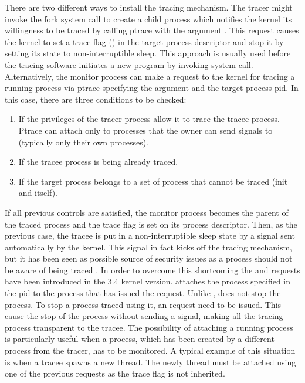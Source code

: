 There are two different ways to install the tracing mechanism. The tracer might invoke the fork system call to create a child process which notifies the kernel its willingness to be traced by calling ptrace with the argument . This request causes the kernel to set a trace flag () in the target process descriptor and stop it by setting its state to non-interruptible sleep. This approach is usually used before the tracing software initiates a new program by invoking  system call. Alternatively, the monitor process can make a request to the kernel for tracing a running process via ptrace specifying the argument  and the target process pid. In this case, there are three conditions to be checked:
\begin{enumerate}
\item If the privileges of the tracer process allow it to trace the tracee process. Ptrace can attach only to processes that the owner can send signals to (typically only their own processes).
\item If the tracee process is being already traced.
\item If the target process belongs to a set of process that cannot be traced (init and itself).
\end{enumerate}

If all previous controls are satisfied, the monitor process becomes the parent of the traced process and the trace flag is set on its process descriptor. Then, as the previous case, the tracee is put in a non-interruptible sleep state by a  signal sent automatically by the kernel. This signal in fact kicks off the tracing mechanism, but it has been seen as possible source of security issues as a process should not be aware of being traced \cite{ptrace_seize}. In order to overcome this shortcoming the  and  requests have been introduced in the 3.4 kernel version.  attaches the process specified in the pid to the process that has issued the request. Unlike ,  does not stop the process. To stop a process traced using it, an  request need to be issued. This cause the stop of the process without sending a  signal, making all the tracing process transparent to the tracee. 
The possibility of attaching a running process is particularly useful when a process, which has been created by a different process from the tracer, has to be monitored. A typical example of this situation is when a tracee spawns a new thread. The newly thread must be attached using one of the previous requests as the trace flag is not inherited.  

